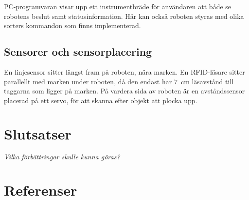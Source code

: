 \documentclass[a4paper,12pt]{article}
\begin{document}
PC-programvaran visar upp ett instrumentbräde för användaren att både se robotens beslut samt statusinformation. Här kan också roboten styras med olika sorters kommandon som finns implementerad.

\subsection{Sensorer och sensorplacering}

En linjesensor sitter längst fram på roboten, nära marken. En RFID-läsare sitter parallellt med marken under roboten, då den endast har 7~cm läsavstånd till taggarna som ligger på marken. På vardera sida av roboten är en avståndssensor placerad på ett servo, för att skanna efter objekt att plocka upp.









\section{Slutsatser}
\emph{Vilka förbättringar skulle kunna göras?}

\newpage
\section*{Referenser}


\newpage
\appendix

\end{document}
